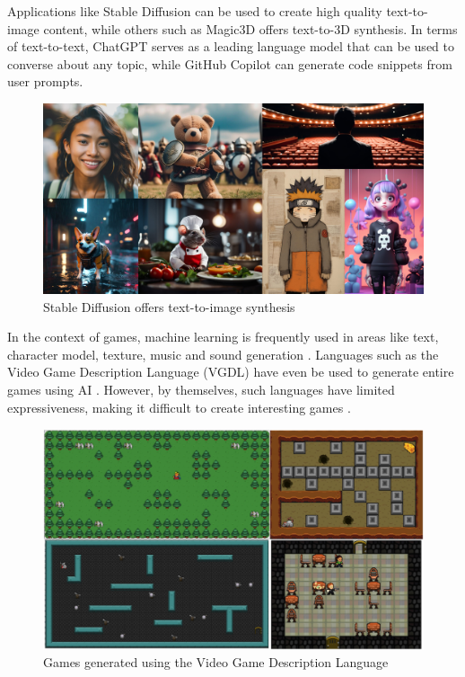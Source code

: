 Applications like Stable Diffusion \cite{Stable_Diffusion} can be used to create high quality text-to-image content, while others such as Magic3D \cite{Magic3D} offers text-to-3D synthesis. In terms of text-to-text, ChatGPT \cite{Chat_GPT} serves as a leading language model that can be used to converse about any topic, while GitHub Copilot \cite{GitHub_Copilot} can generate code snippets from user prompts.

\begin{figure}[H]
    \centering
    \includegraphics[width=\textwidth, height=0.3\textheight, keepaspectratio]{Images/StableDiffusion.jpg}
    \caption{Stable Diffusion offers text-to-image synthesis \cite{Stable_Diffusion}}
    \label{fig:stableDiffusion}
\end{figure}

In the context of games, machine learning is frequently used in areas like text, character model, texture, music and sound generation \cite{DeepLearningPCG}. Languages such as the Video Game Description Language (VGDL) have even be used to generate entire games using AI \cite{VGDL, VGDL_ASP}. However, by themselves, such languages have limited expressiveness, making it difficult to create interesting games \cite{VGDL}.

\begin{figure}[H]
    \centering
    \includegraphics[width=\textwidth, height=0.3\textheight, keepaspectratio]{Images/VGDL.jpg}
    \caption{Games generated using the Video Game Description Language \cite{VGDL}}
    \label{fig:vgdl}
\end{figure}

